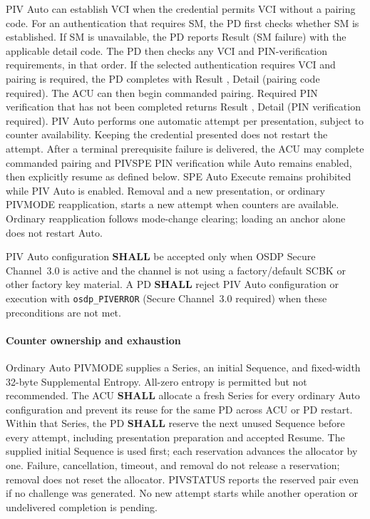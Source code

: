 PIV Auto can establish VCI when the credential permits VCI without a pairing code.
For an authentication that requires SM, the PD first checks whether SM is
established. If SM is unavailable, the PD reports Result  (SM failure)
with the applicable detail code. The PD then checks any VCI and PIN-verification
requirements, in that order.
If the selected authentication requires VCI and pairing is required, the PD
completes with Result , Detail  (pairing code required).
The ACU can then begin commanded pairing. Required PIN verification that has
not been completed returns Result , Detail  (PIN verification
required). PIV Auto performs one automatic attempt per presentation, subject to counter
availability. Keeping the credential presented does not restart the attempt. After a terminal
prerequisite failure is delivered, the ACU may complete commanded pairing and PIVSPE PIN
verification while Auto remains enabled, then explicitly resume as defined below. SPE Auto
Execute remains prohibited while PIV Auto is enabled. Removal and a new presentation, or
ordinary PIVMODE reapplication, starts a new attempt when counters are available. Ordinary
reapplication follows mode-change clearing; loading an anchor alone does not restart Auto.

PIV Auto configuration \textbf{SHALL} be accepted only when OSDP Secure Channel~3.0 is active and the channel is not using a factory/default SCBK or other factory key material. A PD \textbf{SHALL} reject PIV Auto configuration or execution with \texttt{osdp\_PIVERROR}  (Secure Channel~3.0 required) when these preconditions are not met.

\paragraph{Counter ownership and exhaustion}\label{sec:pivauto-counters}
Ordinary Auto PIVMODE supplies a Series, an initial Sequence, and fixed-width 32-byte
Supplemental Entropy. All-zero entropy is permitted but not recommended. The ACU
\textbf{SHALL} allocate a fresh Series for every ordinary Auto configuration and prevent
its reuse for the same PD across ACU or PD restart. Within that Series, the PD
\textbf{SHALL} reserve the next unused Sequence before every attempt, including presentation
preparation and accepted Resume. The supplied initial Sequence is used first; each reservation
advances the allocator by one. Failure, cancellation, timeout, and removal do not release a
reservation; removal does not reset the allocator. PIVSTATUS reports the reserved pair even
if no challenge was generated. No new attempt starts while another operation or undelivered
completion is pending.

